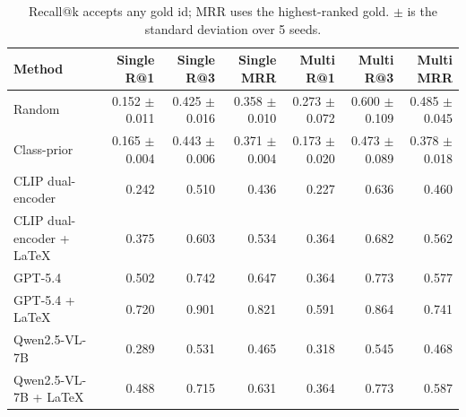\begin{table}[t]
\centering
\caption{Recall@k accepts any gold id; MRR uses the highest-ranked gold. $\pm$ is the standard deviation over 5 seeds.}
\label{tab:gold_count}
\begin{tabular}{lrrrrrr}
\toprule
Method & Single R@1 & Single R@3 & Single MRR & Multi R@1 & Multi R@3 & Multi MRR \\
\midrule
Random & 0.152 $\pm$ 0.011 & 0.425 $\pm$ 0.016 & 0.358 $\pm$ 0.010 & 0.273 $\pm$ 0.072 & 0.600 $\pm$ 0.109 & 0.485 $\pm$ 0.045 \\
Class-prior & 0.165 $\pm$ 0.004 & 0.443 $\pm$ 0.006 & 0.371 $\pm$ 0.004 & 0.173 $\pm$ 0.020 & 0.473 $\pm$ 0.089 & 0.378 $\pm$ 0.018 \\
CLIP dual-encoder & 0.242 & 0.510 & 0.436 & 0.227 & 0.636 & 0.460 \\
CLIP dual-encoder + LaTeX & 0.375 & 0.603 & 0.534 & 0.364 & 0.682 & 0.562 \\
GPT-5.4 & 0.502 & 0.742 & 0.647 & 0.364 & 0.773 & 0.577 \\
GPT-5.4 + LaTeX & 0.720 & 0.901 & 0.821 & 0.591 & 0.864 & 0.741 \\
Qwen2.5-VL-7B & 0.289 & 0.531 & 0.465 & 0.318 & 0.545 & 0.468 \\
Qwen2.5-VL-7B + LaTeX & 0.488 & 0.715 & 0.631 & 0.364 & 0.773 & 0.587 \\
\bottomrule
\end{tabular}
\end{table}
